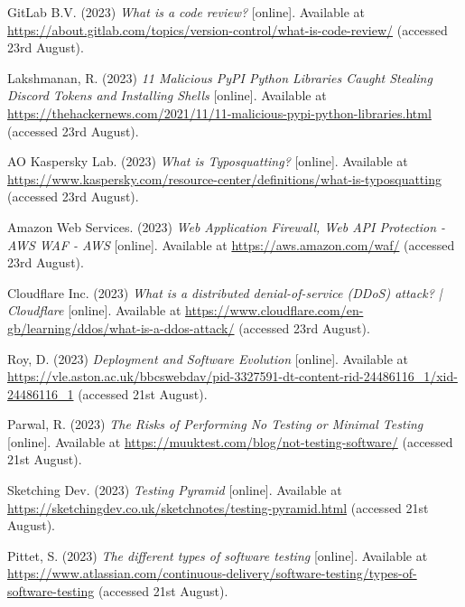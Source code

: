  \noindent [53] GitLab B.V. (2023) \textit{What is a code review?} [online]. Available at \url{https://about.gitlab.com/topics/version-control/what-is-code-review/} (accessed 23rd August).
 \vspace{0.2cm}

 \noindent [54] Lakshmanan, R. (2023) \textit{11 Malicious PyPI Python Libraries Caught Stealing Discord Tokens and Installing Shells} [online]. Available at \url{https://thehackernews.com/2021/11/11-malicious-pypi-python-libraries.html} (accessed 23rd August).
 \vspace{0.2cm}

 \noindent [55] AO Kaspersky Lab. (2023) \textit{What is Typosquatting?} [online]. Available at \url{https://www.kaspersky.com/resource-center/definitions/what-is-typosquatting} (accessed 23rd August).
 \vspace{0.2cm}

 \noindent [56] Amazon Web Services. (2023) \textit{Web Application Firewall, Web API Protection - AWS WAF - AWS} [online]. Available at \url{https://aws.amazon.com/waf/} (accessed 23rd August).
 \vspace{0.2cm}

 \noindent [57] Cloudflare Inc. (2023) \textit{What is a distributed denial-of-service (DDoS) attack? | Cloudflare} [online]. Available at \url{https://www.cloudflare.com/en-gb/learning/ddos/what-is-a-ddos-attack/} (accessed 23rd August).
 \vspace{0.2cm}

 \noindent [TODO1] Roy, D. (2023) \textit{Deployment and Software Evolution} [online]. Available at \url{https://vle.aston.ac.uk/bbcswebdav/pid-3327591-dt-content-rid-24486116_1/xid-24486116_1} (accessed 21st August).
 \vspace{0.2cm}

 \noindent [TODO2] Parwal, R. (2023) \textit{The Risks of Performing No Testing or Minimal Testing} [online]. Available at \url{https://muuktest.com/blog/not-testing-software/} (accessed 21st August).
 \vspace{0.2cm}

 \noindent [TODO3] Sketching Dev. (2023) \textit{Testing Pyramid} [online]. Available at \url{https://sketchingdev.co.uk/sketchnotes/testing-pyramid.html} (accessed 21st August).
 \vspace{0.2cm}

 \noindent [TODO4] Pittet, S. (2023) \textit{The different types of software testing} [online]. Available at \url{https://www.atlassian.com/continuous-delivery/software-testing/types-of-software-testing} (accessed 21st August).
 \vspace{0.2cm}

